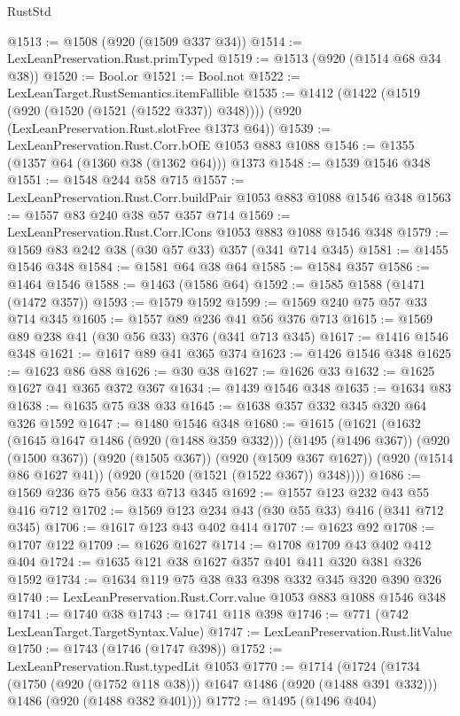 \begin{lexlean}{RustStd}
\begin{coremodule}
@1513 := @1508 (@920 (@1509 @337 @34))
@1514 := LexLeanPreservation.Rust.primTyped
@1519 := @1513 (@920 (@1514 @68 @34 @38))
@1520 := Bool.or
@1521 := Bool.not
@1522 := LexLeanTarget.RustSemantics.itemFallible
@1535 := @1412
    (@1422 (@1519 (@920 (@1520 (@1521 (@1522 @337)) @348))))
    (@920 (LexLeanPreservation.Rust.slotFree @1373 @64))
@1539 := LexLeanPreservation.Rust.Corr.bOfE @1053 @883 @1088
@1546 := @1355 (@1357 @64 (@1360 @38 (@1362 @64))) @1373
@1548 := @1539 @1546 @348
@1551 := @1548 @244 @58 @715
@1557 := LexLeanPreservation.Rust.Corr.buildPair @1053 @883 @1088 @1546 @348
@1563 := @1557 @83 @240 @38 @57 @357 @714
@1569 := LexLeanPreservation.Rust.Corr.lCons @1053 @883 @1088 @1546 @348
@1579 := @1569 @83 @242 @38 (@30 @57 @33) @357 (@341 @714 @345)
@1581 := @1455 @1546 @348
@1584 := @1581 @64 @38 @64
@1585 := @1584 @357
@1586 := @1464 @1546
@1588 := @1463 (@1586 @64)
@1592 := @1585 @1588 (@1471 (@1472 @357))
@1593 := @1579 @1592
@1599 := @1569 @240 @75 @57 @33 @714 @345
@1605 := @1557 @89 @236 @41 @56 @376 @713
@1615 := @1569 @89 @238 @41 (@30 @56 @33) @376 (@341 @713 @345)
@1617 := @1416 @1546 @348
@1621 := @1617 @89 @41 @365 @374
@1623 := @1426 @1546 @348
@1625 := @1623 @86 @88
@1626 := @30 @38
@1627 := @1626 @33
@1632 := @1625 @1627 @41 @365 @372 @367
@1634 := @1439 @1546 @348
@1635 := @1634 @83
@1638 := @1635 @75 @38 @33
@1645 := @1638 @357 @332 @345 @320 @64 @326 @1592
@1647 := @1480 @1546 @348
@1680 := @1615
    (@1621
      (@1632
        (@1645 @1647 @1486 (@920 (@1488 @359 @332)))
        (@1495 (@1496 @367))
        (@920 (@1500 @367))
        (@920 (@1505 @367))
        (@920 (@1509 @367 @1627))
        (@920 (@1514 @86 @1627 @41))
        (@920 (@1520 (@1521 (@1522 @367)) @348))))
@1686 := @1569 @236 @75 @56 @33 @713 @345
@1692 := @1557 @123 @232 @43 @55 @416 @712
@1702 := @1569 @123 @234 @43 (@30 @55 @33) @416 (@341 @712 @345)
@1706 := @1617 @123 @43 @402 @414
@1707 := @1623 @92
@1708 := @1707 @122
@1709 := @1626 @1627
@1714 := @1708 @1709 @43 @402 @412 @404
@1724 := @1635 @121 @38 @1627 @357 @401 @411 @320 @381 @326 @1592
@1734 := @1634 @119 @75 @38 @33 @398 @332 @345 @320 @390 @326
@1740 := LexLeanPreservation.Rust.Corr.value @1053 @883 @1088 @1546 @348
@1741 := @1740 @38
@1743 := @1741 @118 @398
@1746 := @771 (@742 LexLeanTarget.TargetSyntax.Value)
@1747 := LexLeanPreservation.Rust.litValue
@1750 := @1743 (@1746 (@1747 @398))
@1752 := LexLeanPreservation.Rust.typedLit @1053
@1770 := @1714
    (@1724
      (@1734 (@1750 (@920 (@1752 @118 @38))) @1647 @1486 (@920 (@1488 @391 @332)))
      @1486
      (@920 (@1488 @382 @401)))
@1772 := @1495 (@1496 @404)

\end{coremodule}
\end{lexlean}
